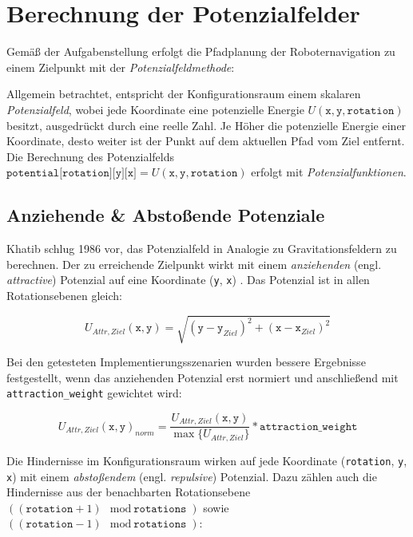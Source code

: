 \chapter{Berechnung der Potenzialfelder}

Gemäß der Aufgabenstellung erfolgt die Pfadplanung der Roboternavigation zu einem Zielpunkt mit der \textit{Potenzialfeldmethode}:

Allgemein betrachtet, entspricht der Konfigurationsraum einem skalaren \textit{Potenzialfeld}, wobei jede Koordinate eine potenzielle Energie $U(\texttt{x}, \texttt{y}, \texttt{rotation})$ besitzt, ausgedrückt durch eine reelle Zahl.
Je Höher die potenzielle Energie einer Koordinate, desto weiter ist der Punkt auf dem aktuellen Pfad vom Ziel entfernt.
\cite{yujiang.2017}
Die Berechnung des Potenzialfelds $\texttt{potential[rotation][y][x]} = U(\texttt{x}, \texttt{y}, \texttt{rotation})$ erfolgt mit \textit{Potenzialfunktionen}.

\section{Anziehende \& Abstoßende Potenziale}

Khatib schlug 1986 vor, das Potenzialfeld in Analogie zu Gravitationsfeldern zu berechnen. Der zu erreichende Zielpunkt wirkt mit einem \textit{anziehenden} (engl. \textit{attractive}) Potenzial auf eine Koordinate (\texttt{y}, \texttt{x}) \cite{khatib.1985}. Das Potenzial ist in allen Rotationsebenen gleich:

\begin{equation*}
U_{Attr, Ziel}(\texttt{x}, \texttt{y}) = \sqrt{(\texttt{y} - \texttt{y}_{Ziel})^2 + (\texttt{x} - \texttt{x}_{Ziel})^2}
\end{equation*}

Bei den getesteten Implementierungsszenarien wurden bessere Ergebnisse festgestellt, wenn das anziehenden Potenzial erst normiert und anschließend mit \texttt{attraction\_weight} gewichtet wird:

\begin{equation*}
U_{Attr, Ziel}(\texttt{x}, \texttt{y})_{norm} = \frac{U_{Attr, Ziel}(\texttt{x}, \texttt{y})}{\max \{ U_{Attr, Ziel}\}} * \texttt{attraction\_weight}
\end{equation*}

Die Hindernisse im Konfigurationsraum wirken auf jede Koordinate (\texttt{rotation}, \texttt{y}, \texttt{x}) mit einem \textit{abstoßendem} (engl. \textit{repulsive}) Potenzial. Dazu zählen auch die Hindernisse aus der benachbarten Rotationsebene $((\texttt{rotation} + 1) \mod \texttt{rotations})$ sowie $((\texttt{rotation} - 1) \mod \texttt{rotations})$:


